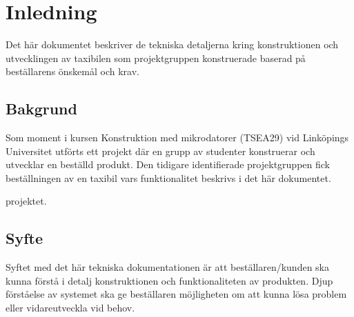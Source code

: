 \documentclass[tekniskrapport/tech.tex]{subfiles}
\begin{document}
\section{Inledning}
Det här dokumentet beskriver de tekniska detaljerna kring konstruktionen och utvecklingen av taxibilen som projektgruppen konstruerade baserad på beställarens önskemål och krav.    

\subsection{Bakgrund}
Som moment i kursen Konstruktion med mikrodatorer (TSEA29) vid Linköpings Universitet utförts ett projekt där en grupp av studenter konstruerar och utvecklar en beställd produkt. Den tidigare identifierade projektgruppen fick beställningen av en taxibil vars funktionalitet beskrivs i det här dokumentet. 

projektet.\cite{svensson-lips}

\subsection{Syfte}
Syftet med det här tekniska dokumentationen är att beställaren/kunden ska kunna förstå i detalj konstruktionen och funktionaliteten av produkten. Djup förståelse av systemet ska ge beställaren möjligheten om att kunna lösa problem eller vidareutveckla vid behov. 
\end{document}
